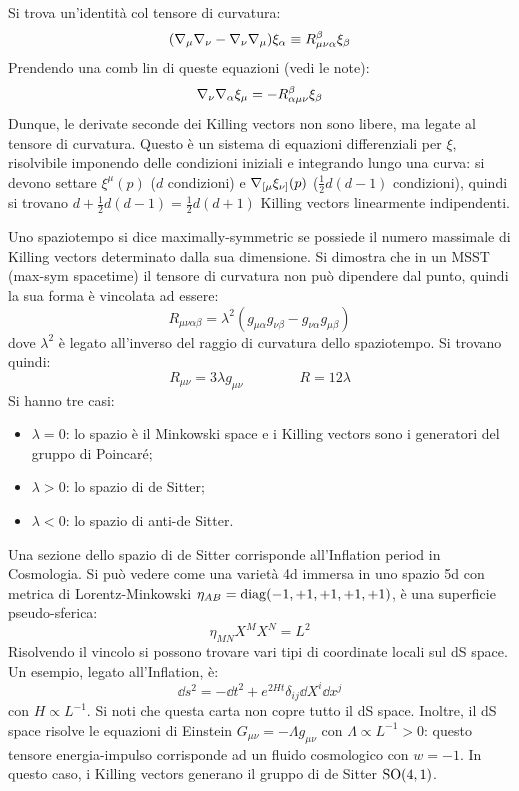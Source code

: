 Si trova un'identità col tensore di curvatura:
\begin{equation*}
  (\nabla_\mu \nabla_\nu - \nabla_\nu \nabla_\mu) \xi_\alpha \equiv R_{\mu \nu \alpha}^\beta \xi_\beta
\end{equation*}
Prendendo una comb lin di queste equazioni (vedi le note):
\begin{equation}
  \nabla_\nu \nabla_\alpha \xi_\mu = - R_{\alpha \mu \nu}^\beta \xi_\beta
\end{equation}
Dunque, le derivate seconde dei Killing vectors non sono libere, ma legate al tensore di curvatura. Questo è un sistema di equazioni differenziali per $ \xi $, risolvibile imponendo delle condizioni iniziali e integrando lungo una curva: si devono settare $ \xi^\mu(p) $ ($ d $ condizioni) e $ \nabla_{[\mu} \xi_{\nu]}(p) $ ($ \frac{1}{2} d (d-1) $ condizioni), quindi si trovano $ d + \frac{1}{2} d(d-1) = \frac{1}{2} d(d+1) $ Killing vectors linearmente indipendenti.

Uno spaziotempo si dice maximally-symmetric se possiede il numero massimale di Killing vectors determinato dalla sua dimensione. Si dimostra che in un MSST (max-sym spacetime) il tensore di curvatura non può dipendere dal punto, quindi la sua forma è vincolata ad essere:
\begin{equation*}
  R_{\mu \nu \alpha \beta} = \lambda^2 \left( g_{\mu \alpha} g_{\nu \beta} - g_{\nu \alpha} g_{\mu \beta} \right)
\end{equation*}
dove $ \lambda^2 $ è legato all'inverso del raggio di curvatura dello spaziotempo. Si trovano quindi:
\begin{equation*}
  R_{\mu \nu} = 3 \lambda g_{\mu \nu}
  \qquad \qquad
  R = 12 \lambda
\end{equation*}
Si hanno tre casi:
\begin{itemize}
  \item $ \lambda = 0 $: lo spazio è il Minkowski space e i Killing vectors sono i generatori del gruppo di Poincaré;
  \item $ \lambda > 0 $: lo spazio di de Sitter;
  \item $ \lambda < 0 $: lo spazio di anti-de Sitter.
\end{itemize}

Una sezione dello spazio di de Sitter corrisponde all'Inflation period in Cosmologia. Si può vedere come una varietà 4d immersa in uno spazio 5d con metrica di Lorentz-Minkowski $ \eta_{AB} = \operatorname{diag}(-1,+1,+1,+1,+1) $, è una superficie pseudo-sferica:
\begin{equation}
  \eta_{MN} X^M X^N = L^2
\end{equation}
Risolvendo il vincolo si possono trovare vari tipi di coordinate locali sul dS space. Un esempio, legato all'Inflation, è:
\begin{equation*}
  \dd s^2 = - \dd t^2 + e^{2Ht} \delta_{ij} \dd X^i \dd x^j
\end{equation*}
con $ H \propto L^{-1} $. Si noti che questa carta non copre tutto il dS space. Inoltre, il dS space risolve le equazioni di Einstein $ G_{\mu \nu} = - \Lambda g_{\mu \nu} $ con $ \Lambda \propto L^{-1} > 0 $: questo tensore energia-impulso corrisponde ad un fluido cosmologico con $ w = -1 $. In questo caso, i Killing vectors generano il gruppo di de Sitter $ \mathrm{SO}(4,1) $.

